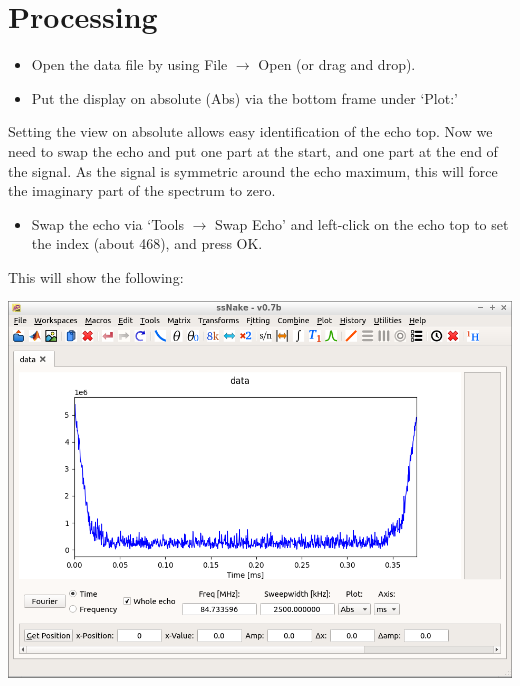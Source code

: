 \documentclass[11pt,a4paper]{article}
\begin{document}
\section{Processing}
\begin{itemize}
\item Open the data file by using File $\longrightarrow$ Open (or drag and drop).
\item Put the display on absolute (Abs) via the bottom frame under `Plot:'
\end{itemize}
Setting the view on absolute allows easy identification of the echo top. Now we need to swap the echo and put one part at the start, and one part at the end of the signal. As the signal is symmetric around the echo maximum, this will force the imaginary part of the spectrum to zero.
\begin{itemize}
\item Swap the echo via `Tools $\longrightarrow$ Swap Echo' and left-click on the echo top to set the index (about 468), and press OK. 
\end{itemize}
This will show the following:
\begin{center}
\includegraphics[width=0.8\linewidth]{Figs/Fig1.png}
\end{center}
\end{document}

